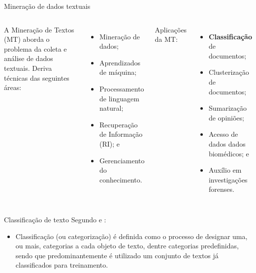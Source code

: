 \documentclass[%
  10pt,%
  aspectratio = 169,%
  compress,%
  t,%
]{beamer}%
\begin{document}
    \begin{frame}{}{Mineração de dados textuais}
        \begin{columns}[t]
            A Mineração de Textos (MT) aborda o problema da coleta e análise de dados textuais. Deriva técnicas das seguintes áreas:

            \begin{itemize}
                \item Mineração de dados;
                \item Aprendizados de máquina;
                \item Processamento de linguagem natural;
                \item Recuperação de Informação (RI); e
                \item Gerenciamento do conhecimento.
            \end{itemize}
            Aplicações da MT:
            \begin{itemize}
                \item \textbf{Classificação} de documentos;
                \item Clusterização de documentos;
                \item Sumarização de opiniões;
                \item Acesso de dados dados biomédicos; e
                \item Auxílio em investigações forenses.
            \end{itemize}
        \end{columns}


        \begin{block}{Classificação de texto}
            Segundo \cite[p.~7]{Jo2018TMCIBDC} e \cite[p.~299]{Zhai2016TDMA}:
            \begin{itemize}
                \item Classificação (ou categorização) é definida como o processo de designar uma, ou mais, categorias a cada objeto de texto, dentre categorias predefinidas, sendo que predominantemente é utilizado um conjunto de textos já classificados para treinamento.
            \end{itemize}
        \end{block}
    \end{frame}
\end{document}
